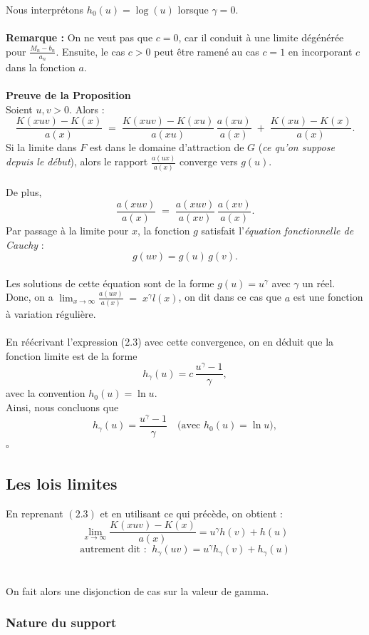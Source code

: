 \documentclass{article}
\begin{document}
Nous interprétons $h_{0}(u) = \log(u)$ lorsque $\gamma = 0$.
\\
\\
\textbf{Remarque :} On ne veut pas que $c=0$, car il conduit à une limite dégénérée pour $\frac{M_{n} - b_n}{a_n}$. 
Ensuite, le cas $c>0$ peut être ramené au cas $c=1$ en incorporant $c$ dans la fonction $a$.   
\\
\\
\textbf{Preuve de la Proposition}  
\\
Soient $u,v >0$. Alors :
\[
\frac{K(xuv) - K(x)}{a(x)} 
\;=\; 
\frac{K(xuv) - K(xu)}{a(xu)} \,\frac{a(xu)}{a(x)}
\;+\;
\frac{K(xu) - K(x)}{a(x)}.
\tag{2.3}
\]
Si la limite dans $F$ est dans le domaine d'attraction de $G$ (\textit{ce qu'on suppose depuis le début}), alors le rapport $\frac{a(ux)}{a(x)}$ converge vers $g(u)$.
\\
\\
De plus,
\[
\frac{a(xuv)}{a(x)} 
\;=\;
\frac{a(xuv)}{a(xv)} \,\frac{a(xv)}{a(x)}.
\]
Par passage à la limite pour $x$, la fonction $g$ satisfait l'\textit{équation fonctionnelle de Cauchy} :
\[
g(uv) = g(u)\,g(v).
\]
\\
Les solutions de cette équation sont de la forme $g(u)= u^{\gamma}$ avec $\gamma$ un réel.
\\
Donc, on a $\lim_{x\to \infty} \frac{a(ux)}{a(x)} \;=\; x^{\gamma} l(x)$, on dit dans ce cas que $a$ est une fonction à variation régulière.
\\
\\
En réécrivant l'expression (2.3) avec cette convergence, on en déduit que la fonction limite est de la forme
\[
h_\gamma(u)= c\,\frac{u^\gamma-1}{\gamma},
\]
avec la convention \(h_0(u)=\ln u\).
\\
Ainsi, nous concluons que
\[
h_\gamma(u)=\frac{u^\gamma-1}{\gamma} \quad \text{(avec \(h_0(u)=\ln u\))},
\]
\hfill $\square$
\\
\subsection{Les lois limites}
En reprenant $(2.3)$ et en utilisant ce qui précède, on obtient :
\[
\lim_{x\to \infty} \frac{K(xuv) - K(x)}{a(x)} = u^{\gamma} h(v) + h(u)
\]
\[
\text{autrement dit :} \; \; h_{\gamma}(uv)= u^{\gamma} h_{\gamma}(v) + h_{\gamma}(u)
\]
\\
\\
On fait alors une disjonction de cas sur la valeur de gamma.
\\
\subsubsection{Nature du support}
\end{document}
